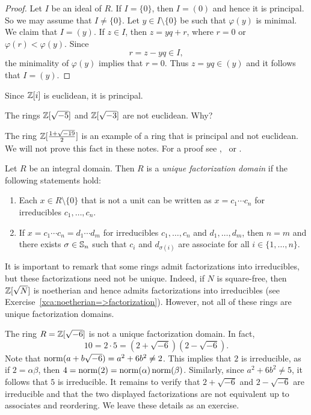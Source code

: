 \begin{proof}
	Let $I$ be an ideal of $R$. If $I=\{0\}$, then $I=(0)$ and hence 
	it is principal. So we may
	assume that $I\ne\{0\}$. Let $y\in I\setminus\{0\}$ be such that
	$\varphi(y)$ is minimal. We claim that $I=(y)$. 
	If $z\in I$, then $z=yq+r$, where $r=0$ or $\varphi(r)<\varphi(y)$.
  Since
  \[
  r=z-yq\in I,
  \]
	the minimality of $\varphi(y)$ implies that $r=0$. Thus $z=yq\in (y)$ and 
	it follows that 
	$I=(y)$. 
\end{proof}

\begin{example}
	Since $\mathbb{Z}[i]$ is euclidean, it is principal.
\end{example}
 
\begin{example}
	The rings $\mathbb{Z}[\sqrt{-5}]$ and $\mathbb{Z}[\sqrt{-3}]$ are
	not euclidean. Why?
\end{example}

The ring $\mathbb{Z}[\frac{1+\sqrt{-19}}{2}]$ is an 
example of a ring that is principal and not euclidean. We will not prove this
fact in these notes. For a proof 
see \cite{MR967349}, \cite{MR3665445} or \cite{MR314831}.

\begin{definition}
  \label{def:UFD}
	Let $R$ be an integral domain. Then $R$ is a 
	\emph{unique factorization domain}
	if the following statements hold:
	\begin{enumerate}
	\item Each $x\in R\setminus\{0\}$ that is not a unit can be written as $x=c_1\cdots c_n$ for irreducibles $c_1,\dots,c_n$. 
	\item If $x=c_1\cdots c_n=d_1\cdots d_m$ for irreducibles $c_1,\dots,c_n$ and $d_1,\dots,d_m$, then $n=m$ and there exists $\sigma\in\mathbb{S}_n$ such that $c_i$ and $d_{\sigma(i)}$ are
		associate for all $i\in\{1,\dots,n\}$. 
	\end{enumerate}
\end{definition}

It is important to remark that some rings admit factorizations
into irreducibles, but these factorizations need not be unique.
Indeed, if $N$ is square-free, then $\mathbb{Z}[\sqrt{N}]$ is noetherian
and hence admits factorizations into irreducibles (see 
Exercise~\ref{xca:noetherian=>factorization}). However, not
all of these rings are unique factorization domains.

\begin{example}
	The ring $R=\mathbb{Z}[\sqrt{-6}]$ is not a unique factorization domain. In fact,
	\[
	10=2\cdot 5=(2+\sqrt{-6})(2-\sqrt{-6}).
	\]	
	Note that $\operatorname{norm}(a+b\sqrt{-6})=a^2+6b^2\ne 2$. This implies that $2$ is irreducible, as 
	if $2=\alpha\beta$, then $4=\operatorname{norm}(2)=\operatorname{norm}(\alpha)\operatorname{norm}(\beta)$. 
	Similarly, since $a^2+6b^2\ne 5$, it follows that $5$ is irreducible.
  It remains to verify that $2+\sqrt{-6}$ and $2-\sqrt{-6}$ are
  irreducible and that the two displayed factorizations are not equivalent
  up to associates and reordering. We leave these details as an exercise. 
\end{example}

